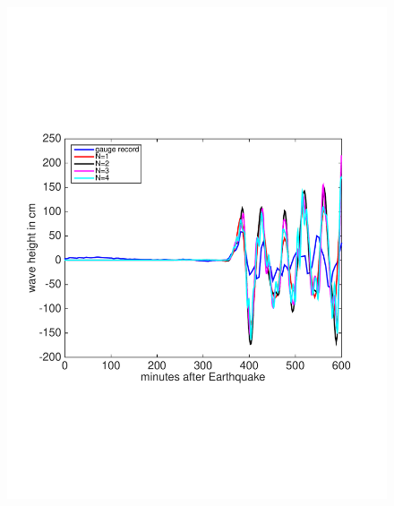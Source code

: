 \begin{figure}
\begin{center}
{\begin{minipage}[c]{0.45\linewidth}
      \includegraphics[trim=0cm 6cm 2cm 7cm,clip=true,width=\textwidth]{./figures/mormugaoGaugeCon.pdf}
  \end{minipage}} \hspace{0.5cm}
\end{center}
\end{figure}
